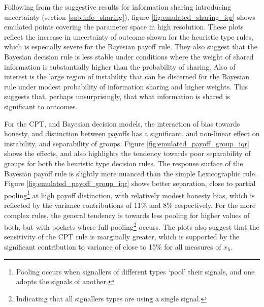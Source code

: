 Following from the suggestive results for information sharing introducing uncertainty (section \ref{sub:info_sharing}), figure \ref{fig:emulated_sharing_iqr} shows emulated points covering the parameter space in high resolution. These plots reflect the increase in uncertainty of outcome shown for the heuristic type rules, which is especially severe for the Bayesian payoff rule. They also suggest that the Bayesian decision rule is less stable under conditions where the weight of shared information is substantially higher than the probability of sharing. Also of interest is the large region of instability that can be discerned for the Bayesian rule under modest probability of information sharing and higher weights. This suggests that, perhaps unsurprisingly, that what information is shared is significant to outcomes.

For the \ac{CPT}, and Bayesian decision models, the interaction of bias towards honesty, and distinction between payoffs has a significant, and non-linear effect on instability, and separability of groups. Figure \ref{fig:emulated_payoff_group_iqr} shows the effects, and also highlights the tendency towards poor separability of groups for both the heuristic type decision rules. The response surface of the Bayesian payoff rule is slightly more nuanced than the simple Lexicographic rule. Figure \ref{fig:emulated_payoff_group_iqr} shows better separation, close to partial pooling\footnote{Pooling occurs when signallers of different types `pool' their signals, and one adopts the signals of another.} at high payoff distinction, with relatively modest honesty bias, which is reflected by the variance contributions of 11\% and 8\% respectively.  For the more complex rules, the general tendency is towards less pooling for higher values of both, but with pockets where full pooling\footnote{Indicating that all signallers types are using a single signal.} occurs.  The plots also suggest that the sensitivity of the \ac{CPT} rule is marginally greater, which is supported by the significant contribution to variance of close to 15\% for all measures of \(x_{h}\).

